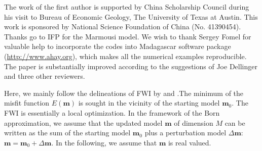 The work of the first author is supported by China Scholarship Council during his visit to Bureau of Economic Geology, The University of Texas at Austin. 
This work is sponsored by National Science Foundation of China (No. 41390454). Thanks go to IFP for the Marmousi model. We wish to thank Sergey Fomel for valuable help to incorporate the codes into Madagascar software package \citep{m8r} (\url{http://www.ahay.org}), which makes all the numerical examples reproducible. The paper is substantially improved according to the suggestions of Joe Dellinger and three other reviewers.


\label{app:misfit}

Here, we mainly follow the delineations of FWI by \cite{pratt1998gauss} and  \cite{virieux2009overview}.The minimum of the misfit function $E(\textbf{m})$ is sought in the vicinity of the starting model $\textbf{m}_0$. The FWI is essentially a local optimization.
In the framework of the Born approximation, we assume that the updated model $\textbf{m}$ of dimension $M$ can be written as the sum of the starting model $\textbf{m}_0$ plus a perturbation model $\Delta \textbf{m}$: $\textbf{m}=\textbf{m}_0+\Delta \textbf{m}$. In the following, we assume that $\textbf{m}$ is real valued.

